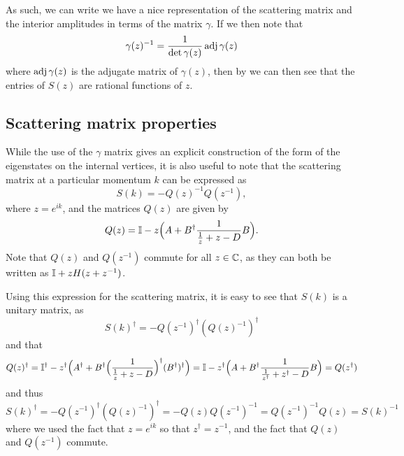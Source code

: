 \documentclass[../thesis-main/thesis-main]{subfiles}
\begin{document}
As such, we can write we have a nice representation of the scattering matrix and the interior amplitudes in terms of the matrix $\gamma$.  If we then note that
\begin{equation}
  \gamma(z)^{-1} = \frac{1}{\det \gamma(z)} \operatorname{adj} \gamma (z)
\end{equation}
where $\operatorname{adj} \gamma (z)$ is the adjugate matrix of $\gamma(z)$, then by  we can then see that the entries of $S(z)$ are rational functions of $z$. 


\subsection{Scattering matrix properties}

While the use of the $\gamma$ matrix gives an explicit construction of the form of the eigenstates on the internal vertices, it is also useful to note that the scattering matrix at a particular momentum $k$ can be expressed as
\begin{equation}
  S(k) = - Q(z)^{-1} Q(z^{-1}),
\end{equation}
where $z=e^{i k}$, and the matrices $Q(z)$ are given by
\begin{equation}
  Q(z) = \mathbb{I} - z \Big( A + B^\dag \frac{1}{ \frac{1}{z} + z - D} B\Big).
\end{equation}
Note that $Q(z)$ and $Q(z^{-1})$ commute for all $z\in \mathbb{C}$, as they can both be written as $\mathbb{I} + z H(z + z^{-1})$.

Using this expression for the scattering matrix, it is easy to see that $S(k)$ is a unitary matrix, as 
\begin{equation}
  S(k)^{\dag} = - Q(z^{-1})^\dag (Q(z)^{-1})^\dag
\end{equation}
and that
\begin{equation}
  Q(z)^\dag = \mathbb{I}^\dag - z^\dag\Big( A^\dag + B^\dag \Big(\frac{1}{\frac{1}{z} + z - D}\Big)^\dag (B^\dag)^\dag\Big) 
     = \mathbb{I} - z^\dag \Big(A + B^\dag \frac{1}{\frac{1}{z^\dag} + z^\dag - D} B \Big) = Q(z^\dag)
\end{equation}
and thus
\begin{equation}
  S(k)^\dag = -Q(z^{-1})^\dag (Q(z)^{-1})^\dag = - Q(z) Q(z^{-1})^{-1} = Q(z^{-1})^{-1} Q(z) = S(k)^{-1}
\end{equation}
where we used the fact that $z=e^{ik}$ so that $z^\dag = z^{-1}$, and the fact that $Q(z)$ and $Q(z^{-1})$ commute.
\end{document}
